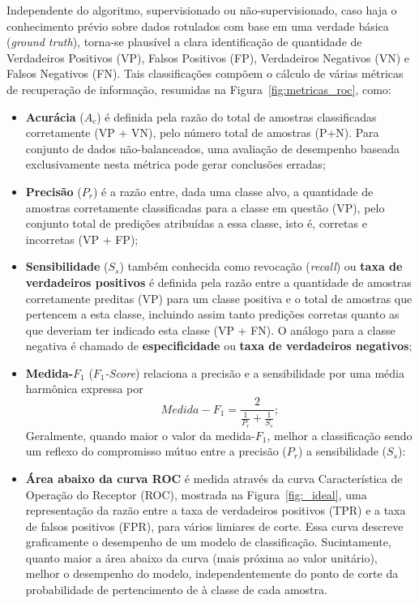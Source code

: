 \documentclass{SBCbookchapter}
\begin{document}
Independente do algoritmo, supervisionado ou não-supervisionado, caso haja o conhecimento prévio sobre dados rotulados com base em uma verdade básica (\textit{ground truth}), torna-se plausível a clara identificação de quantidade de Verdadeiros Positivos (VP), Falsos Positivos (FP), Verdadeiros Negativos (VN) e Falsos Negativos (FN). Tais classificações compõem o cálculo de várias métricas de recuperação de informação, resumidas na Figura~\ref{fig:metricas_roc}, como:
\begin{itemize}
    \item \textbf{Acurácia} ($A_c$) é definida pela razão do total de amostras classificadas corretamente (VP + VN), pelo número total de amostras (P+N). Para conjunto de dados não-balanceados, uma avaliação de desempenho baseada exclusivamente nesta métrica pode gerar conclusões erradas;
    \item \textbf{Precisão} ($P_r$) é a razão entre, dada uma classe alvo, a quantidade de amostras corretamente classificadas para a classe em questão (VP), pelo conjunto total de predições atribuídas a essa classe, isto é, corretas e incorretas (VP + FP);
    \item \textbf{Sensibilidade} ($S_s$) também conhecida como revocação (\textit{recall}) ou \textbf{taxa de verdadeiros positivos} é definida pela razão entre a quantidade de amostras corretamente preditas (VP) para um classe positiva e o total de amostras que pertencem a esta classe, incluindo assim tanto predições corretas quanto as que deveriam ter indicado esta classe (VP + FN). O análogo para a classe negativa é chamado de \textbf{especificidade} ou \textbf{taxa de verdadeiros negativos};
    \item \textbf{Medida-$F_{1}$} (\textit{$F_{1}$-Score}) relaciona a precisão e a sensibilidade por uma média harmônica expressa por 
\begin{equation}
    Medida-F_{1} = \frac{2}{\frac{1}{P_{r}}+\frac{1}{S_{s}}};
\end{equation}
    Geralmente, quando maior o valor da medida-$F_{1}$, melhor a classificação sendo um reflexo do compromisso mútuo entre a precisão ($P_r$) a sensibilidade ($S_s$): 
\end{itemize}

\begin{itemize}
    \item \textbf{Área abaixo da curva ROC} é medida através da curva Característica de Operação do Receptor (ROC), mostrada na Figura~\ref{fig:_ideal}, uma representação da razão entre a taxa de verdadeiros positivos (TPR) e a taxa de falsos positivos (FPR), para vários limiares de corte. Essa curva descreve graficamente o desempenho de um modelo de classificação. Sucintamente, quanto maior a área abaixo da curva (mais próxima ao valor unitário), melhor o desempenho do modelo, independentemente do ponto de corte da probabilidade de pertencimento de à classe de cada amostra. 
\end{itemize}
\end{document}
